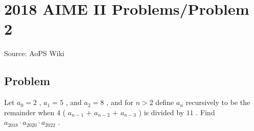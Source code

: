 \documentclass[12pt]{article}
\begin{document}
\section*{{2018 AIME II Problems/Problem 2}}
Source: AoPS Wiki

\subsection*{Problem}
Let $a_{0} = 2$ , $a_{1} = 5$ , and $a_{2} = 8$ , and for $n > 2$ define $a_{n}$ recursively to be the remainder when $4$ ( $a_{n-1}$ $+$ $a_{n-2}$ $+$ $a_{n-3}$ ) is divided by $11$ . Find $a_{2018} \cdot a_{2020} \cdot a_{2022}$ .
\end{document}
